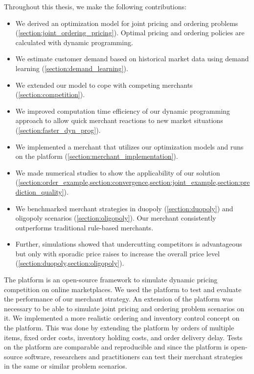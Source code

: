 Throughout this thesis, we make the following contributions:
\begin{itemize}
	\item We derived an optimization model for joint pricing and ordering problems (\cref{section:joint_ordering_pricing}). Optimal pricing and ordering policies are calculated with dynamic programming.
	\item We estimate customer demand based on historical market data using demand learning (\cref{section:demand_learning}).
	\item We extended our model to cope with competing merchants (\cref{section:competition}).
	\item We improved computation time efficiency of our dynamic programming approach to allow quick merchant reactions to new market situations (\cref{section:faster_dyn_prog}).
	\item We implemented a merchant that utilizes our optimization models and runs on the  \pricewars platform (\cref{section:merchant_implementation}).
	\item We made numerical studies to show the applicability of our solution (\cref{section:order_example,section:convergence,section:joint_example,section:prediction_quality}).
	\item We benchmarked merchant strategies in duopoly (\cref{section:duopoly}) and oligopoly scenarios (\cref{section:oligopoly}). Our merchant consistently outperforms traditional rule-based merchants.
	\item Further, simulations showed that undercutting competitors is advantageous but only with sporadic price raises to increase the overall price level (\cref{section:duopoly,section:oligopoly}).
\end{itemize}

The \pricewars platform is an open-source framework to simulate dynamic pricing competition on online marketplaces.
We used the platform to test and evaluate the performance of our merchant strategy.
An extension of the platform was necessary to be able to simulate joint pricing and ordering problem scenarios on it.
We implemented a more realistic ordering and inventory control concept on the \pricewars platform.
This was done by extending the platform by orders of multiple items, fixed order costs, inventory holding costs, and order delivery delay.
Tests on the platform are comparable and reproducible and since the platform is open-source software, researchers and practitioners can test their merchant strategies in the same or similar problem scenarios.

